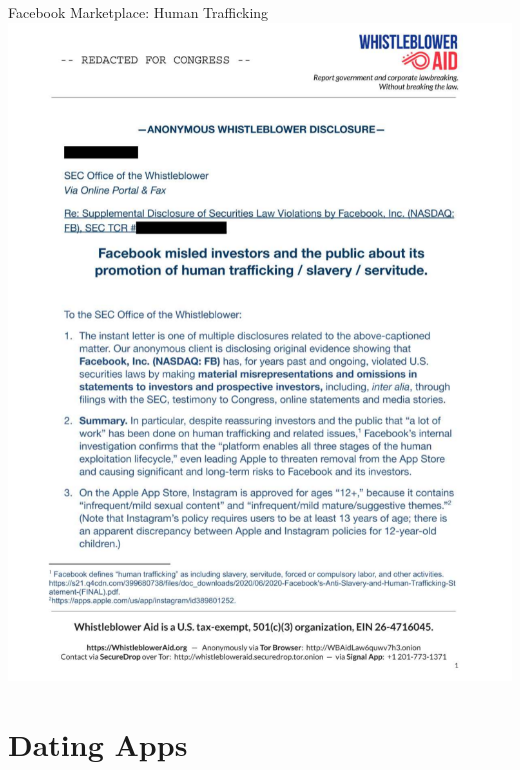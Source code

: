 \documentclass[nobackground,dvipsnames,table,aspectratio=169]{beamer}
\begin{document}
\begin{frame}{Facebook Marketplace: Human Trafficking}
    \centering
    \includegraphics[height=0.85\textheight]{facebook-human-trafficking-whistleblower}
\end{frame}

\section{Dating Apps}
\end{document}
